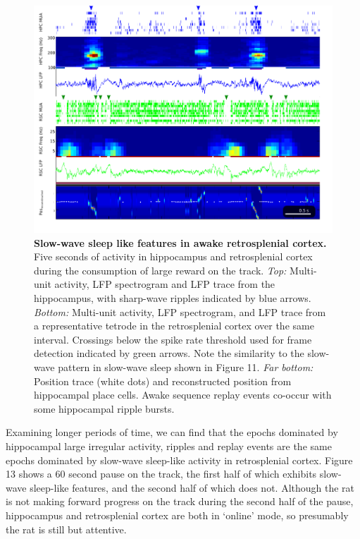 \documentclass[]{article}
\begin{document}
\begin{figure}[htbp]
\centering
\includegraphics{./finalFigs/SWW/exampleDetail.png}
\caption{\textbf{Slow-wave sleep like features in awake retrosplenial
cortex.} Five seconds of activity in hippocampus and retrosplenial
cortex during the consumption of large reward on the track. \emph{Top:}
Multi-unit activity, LFP spectrogram and LFP trace from the hippocampus,
with sharp-wave ripples indicated by blue arrows. \emph{Bottom:}
Multi-unit activity, LFP spectrogram, and LFP trace from a
representative tetrode in the retrosplenial cortex over the same
interval. Crossings below the spike rate threshold used for frame
detection indicated by green arrows. Note the similarity to the
slow-wave pattern in slow-wave sleep shown in Figure 11. \emph{Far
bottom:} Position trace (white dots) and reconstructed position from
hippocampal place cells. Awake sequence replay events co-occur with some
hippocampal ripple bursts.}
\end{figure}

Examining longer periods of time, we can find that the epochs dominated
by hippocampal large irregular activity, ripples and replay events are
the same epochs dominated by slow-wave sleep-like activity in
retrosplenial cortex. Figure 13 shows a 60 second pause on the track,
the first half of which exhibits slow-wave sleep-like features, and the
second half of which does not. Although the rat is not making forward
progress on the track during the second half of the pause, hippocampus
and retrosplenial cortex are both in `online' mode, so presumably the
rat is still but attentive.
\end{document}
